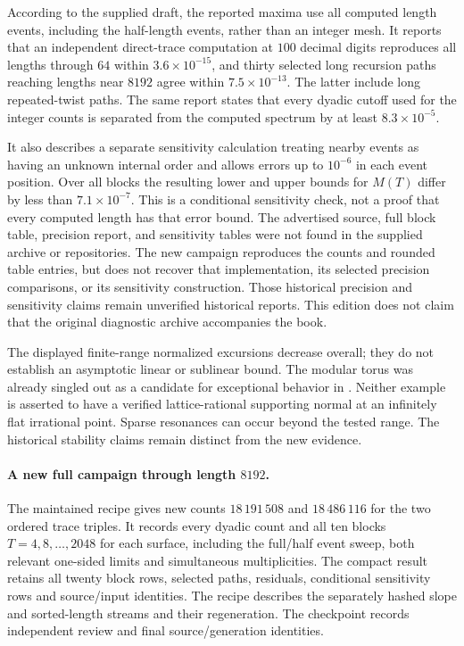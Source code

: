 According to the supplied draft, the reported maxima use all computed
length events, including the half-length events, rather than an integer
mesh. It reports that an independent direct-trace computation at $100$
decimal digits reproduces
all lengths through $64$ within $3.6\times10^{-15}$, and thirty
selected long recursion paths reaching lengths near $8192$ agree within
$7.5\times10^{-13}$. The latter include long repeated-twist paths.
The same report states that every dyadic cutoff used for the integer counts is separated from the
computed spectrum by at least $8.3\times10^{-5}$.

It also describes a separate sensitivity calculation treating nearby events as having an
unknown internal order and allows errors up to $10^{-6}$ in each event
position. Over all blocks the resulting lower and upper bounds for
$M(T)$ differ by less than $7.1\times10^{-7}$. This is a conditional
sensitivity check, not a proof that every computed length has that error
bound. The advertised source, full block table, precision report, and
sensitivity tables were not found in the supplied archive or repositories.
The new campaign reproduces the counts and rounded table entries, but
does not recover that implementation, its selected precision comparisons,
or its sensitivity construction. Those historical precision and
sensitivity claims remain unverified historical reports. This edition
does not claim that the original diagnostic archive accompanies the book.

The displayed finite-range normalized excursions decrease overall;
they do not establish an asymptotic linear or sublinear bound. The modular
torus was already singled out as a candidate for exceptional behavior in
\cite[Conjecture~4.3]{McShaneRivinTori}. Neither example is asserted to
have a verified lattice-rational supporting normal at an infinitely flat
irrational point. Sparse resonances can occur beyond the tested range.
The historical stability claims remain distinct from the new evidence.

\paragraph{A new full campaign through length $8192$.}
The maintained recipe  gives
new counts $18\,191\,508$ and $18\,486\,116$ for the two ordered trace
triples. It records every dyadic count and all ten blocks
$T=4,8,\ldots,2048$ for each surface, including the full/half event
sweep, both relevant one-sided limits and simultaneous multiplicities.
The compact result  retains
all twenty block rows, selected paths, residuals, conditional sensitivity
rows and source/input identities. The recipe describes the separately
hashed slope and sorted-length streams and their regeneration. The
checkpoint 
records independent review and final source/generation identities.

